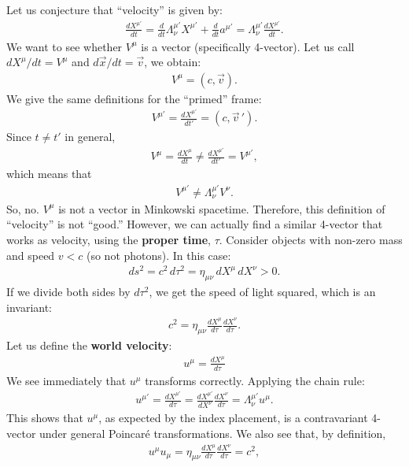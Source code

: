 \documentclass{book}
\theoremstyle{definition}
\begin{document}
Let us conjecture that ``velocity'' is given by:
\begin{align*}
\frac{dX^{\mu'}}{dt} = \frac{d}{dt}\Lambda^{\mu'}_\nu X^{\mu'} + \frac{d}{dt}a^{\mu'} = \Lambda^{\mu'}_\nu \frac{dX^{\mu'}}{dt}.
\end{align*}
We want to see whether $V^\mu$ is a vector (specifically 4-vector). Let us call $dX^{\mu}/dt = V^\mu$ and $d\vec{x}/dt = \vec{v}$, we obtain:
\begin{align*}
V^\mu = (c,\vec{v}).
\end{align*}
We give the same definitions for the ``primed'' frame:
\begin{align*}
V^{\mu'} = \frac{dX^{\mu'}}{dt'} = (c, \vec{v}\,').
\end{align*}
Since $t \neq t'$ in general, 
\begin{align*}
V^{\mu} = \frac{dX^\mu}{dt} \neq \frac{dX^{\mu'}}{dt'} = V^{\mu'},
\end{align*}
which means that
\begin{align*}
V^{\mu'} \neq \Lambda^{\mu'}_\nu V^{\nu}.
\end{align*}
So, no. $V^\mu$ is not a vector in Minkowski spacetime. Therefore, this definition of ``velocity'' is not ``good.'' However, we can actually find a similar 4-vector that works as velocity, using the \textbf{proper time}, $\tau$. Consider objects with non-zero mass and speed $v < c$ (so not photons). In this case:
\begin{align*}
ds^2 = c^2\,d\tau^2 = \eta_{\mu\nu}\,dX^\mu\,dX^\nu > 0.
\end{align*}
If we divide both sides by $d\tau^2$, we get the speed of light squared, which is an invariant:
\begin{align*}
c^2 = \eta_{\mu\nu}\frac{dX^\mu}{d\tau}\frac{dX^\nu}{d\tau}. 
\end{align*}
Let us define the \textbf{world velocity}:
\begin{align*}
\boxed{u^\mu = \frac{dX^\mu}{d\tau}}
\end{align*}
We see immediately that $u^\mu$ transforms correctly. Applying the chain rule:
\begin{align*}
u^{\mu'} = \frac{dX^{\mu'}}{d\tau} = \frac{dX^{\mu'}}{dX^\nu}\frac{dX^\nu}{d\tau} = \Lambda^{\mu'}_\nu u^\mu.
\end{align*}
This shows that $u^\mu$, as expected by the index placement, is a contravariant 4-vector under general Poincar\'e transformations. We also see that, by definition,
\begin{align*}
u^\mu u_\mu = \eta_{\mu\nu}\frac{dX^\mu}{d\tau}\frac{dX^\nu}{d\tau} = c^2,
\end{align*}
\end{document}

